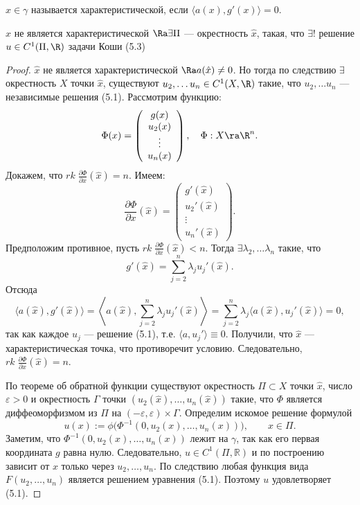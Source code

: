 \begin{definition}
    \(\hat{x} \in \gamma\) называется характеристической, если \(\langle a(x), g'(x) \rangle = 0\).
\end{definition}

\begin{theorem}
    \(\hat{x}\) не является характеристической \(\Ra \exists \Pi\) --- окрестность \(\hat{x}\), такая, что \(\exists!\) решение \(u \in C^1(\Pi, \R)\) задачи Коши (5.3)
\end{theorem}
\begin{proof}
    \(\hat{x}\) не является характеристической \(\Ra a(\hat{x}) \ne 0\). Но тогда по следствию \(\exists\) окрестность \(X\) точки \(\hat{x}\), существуют \(u_2, \dots u_n \in C^1(X, \R)\) такие, что \(u_2, \dots u_n\) --- независимые решения (5.1). Рассмотрим функцию:
    \[\Phi(x) = \left(\begin{array}{c}
        g(x) \\
        u_2(x) \\
        \vdots \\
        u_n(x)
    \end{array}\right), \quad \Phi: X \ra \R^n.\]
    Докажем, что \(rk\;\frac{\partial \Phi}{\partial x}(\hat{x}) = n\). Имеем:
    \[\frac{\partial \Phi}{\partial x}(\hat{x}) = \left(\begin{array}{c}
        g'(\hat{x}) \\
        u_2'(\hat{x}) \\
        \vdots \\
        u_n'(\hat{x})
    \end{array}\right).\]
    Предположим противное, пусть \(rk\;\frac{\partial \Phi}{\partial x}(\hat{x}) < n\). Тогда \(\exists \lambda_2, \dots \lambda_n\) такие, что
    \[g'(\hat{x}) = \sum_{j = 2}^n \lambda_j u_j'(\hat{x}).\]
    Отсюда
    \[\langle a(\hat{x}), g'(\hat{x}) \rangle = \left\langle a(\hat{x}), \sum_{j = 2}^n \lambda_j u_j'(\hat{x}) \right\rangle = \sum_{j = 2}^n \lambda_j \langle a(\hat{x}), u_j'(\hat{x}) \rangle = 0,\]
    так как каждое \(u_j\) — решение (5.1), т.е. \(\langle a, u_j'\rangle \equiv 0\). Получили, что \(\hat{x}\) — характеристическая точка, что противоречит условию. Следовательно, \(rk\;\frac{\partial \Phi}{\partial x}(\hat{x}) = n\).

    По теореме об обратной функции существуют окрестность \(\Pi \subset X\) точки \(\hat{x}\), число \(\varepsilon>0\) и окрестность \(\Gamma\) точки \((u_2(\hat{x}),\dots,u_n(\hat{x}))\) такие, что \(\Phi\) является диффеоморфизмом из \(\Pi\) на \((-\varepsilon,\varepsilon)\times\Gamma\). Определим искомое решение формулой
    \[
    u(x) := \phi\bigl(\Phi^{-1}(0, u_2(x), \dots, u_n(x))\bigr), \qquad x\in\Pi.
    \]
    Заметим, что \(\Phi^{-1}(0, u_2(x), \dots, u_n(x))\) лежит на \(\gamma\), так как его первая координата \(g\) равна нулю. Следовательно, \(u\in C^1(\Pi,\mathbb{R})\) и по построению зависит от \(x\) только через \(u_2,\dots,u_n\). По следствию любая функция вида \(F(u_2,\dots,u_n)\) является решением уравнения (5.1). Поэтому \(u\) удовлетворяет (5.1).


\end{proof}
